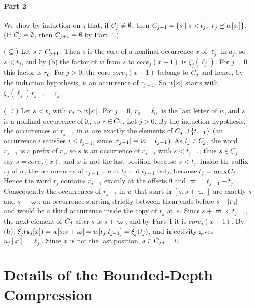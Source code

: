 \paragraph{Part 2}
We show by induction on $j$ that, if $C_j \ne \emptyset$, then
$C_{j+1} = \{s \mid s < t_j,\ r_j \preceq w[s{:}]\}$. (If $C_j = \emptyset$, then
$C_{j+1} = \emptyset$ by Part~1.)

($\subseteq$) Let $s \in C_{j+1}$. Then $s$ is the core of a nonfinal occurrence $x$ of
$\ell_j$ in $u_j$, so $s < t_j$, and by (b) the factor of $w$ from $s$ to
$\mathit{core}_j(x+1)$ is $\xi_j(\ell_j)$. For $j = 0$ this factor is $r_0$. For $j > 0$, the
core $\mathit{core}_j(x+1)$ belongs to $C_j$ and hence, by the induction hypothesis, is an
occurrence of $r_{j-1}$. So $w[s{:}]$ starts with $\xi_j(\ell_j)\,r_{j-1} = r_j$.

($\supseteq$) Let $s < t_j$ with $r_j \preceq w[s{:}]$. For $j = 0$, $r_0 = \ell_0$ is the last
letter of $w$, and $s$ is a nonfinal occurrence of it, so $s \in C_1$. Let $j > 0$. By the
induction hypothesis, the occurrences of $r_{j-1}$ in $w$ are exactly the elements of
$C_j \cup \{t_{j-1}\}$ (an occurrence $i$ satisfies $i \le t_{j-1}$, since
$\lvert r_{j-1}\rvert = m - t_{j-1}$). As $t_j \in C_j$, the word $r_{j-1}$ is a prefix of $r_j$,
so $s$ is an occurrence of $r_{j-1}$ with $s < t_{j-1}$; thus $s \in C_j$, say
$s = \mathit{core}_j(x)$, and $x$ is not the last position because $s < t_j$. Inside the
suffix $r_j$ of $w$, the occurrences of $r_{j-1}$ are at $t_j$ and $t_{j-1}$ only, because
$t_j = \max C_j$. Hence the word $r_j$ contains $r_{j-1}$ exactly at the offsets $0$ and
$\varpi = t_{j-1} - t_j$. Consequently the occurrences of $r_{j-1}$ in $w$ that start in
$[s, s+\varpi]$ are exactly $s$ and $s+\varpi$: an occurrence starting strictly between them
ends before $s + \lvert r_j\rvert$ and would be a third occurrence inside the copy of $r_j$ at~$s$.
Since $s + \varpi < t_{j-1}$, the next element of $C_j$ after $s$ is $s + \varpi$, and by
Part~1 it is $\mathit{core}_j(x+1)$. By (b),
$\xi_j(u_j[x]) = w[s{:}s+\varpi] = w[t_j{:}t_{j-1}] = \xi_j(\ell_j)$, and
injectivity gives $u_j[x] = \ell_j$. Since $x$ is not the last position, $s \in C_{j+1}$.
\qed

\section{Details of the Bounded-Depth Compression}
\label{app:search}

